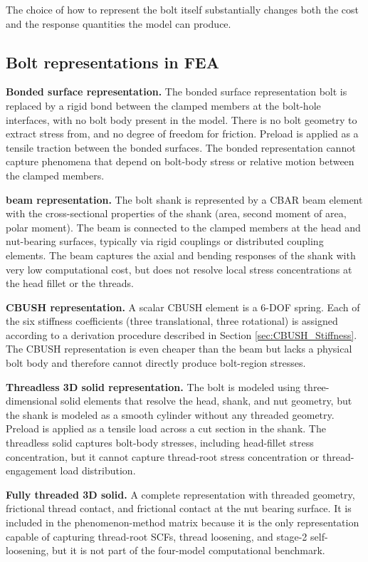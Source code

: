 \documentclass[a4paper,twoside]{bth}
\begin{document}
The choice of how to represent the bolt itself substantially changes both the cost and the response quantities the model can produce.

\subsection{Bolt representations in FEA}
\textbf{Bonded surface representation.} The bonded surface representation bolt is replaced by a rigid bond between the clamped members at the bolt-hole interfaces, with no bolt body present in the model. There is no bolt geometry to extract stress from, and no degree of freedom for friction. Preload is applied as a tensile traction between the bonded surfaces. The bonded representation cannot capture phenomena that depend on bolt-body stress or relative motion between the clamped members.

\textbf{beam representation.} The bolt shank is represented by a CBAR beam element with the cross-sectional properties of the shank (area, second moment of area, polar moment). The beam is connected to the clamped members at the head and nut-bearing surfaces, typically via rigid couplings or distributed coupling elements. The beam captures the axial and bending responses of the shank with very low computational cost, but does not resolve local stress concentrations at the head fillet or the threads.

\textbf{CBUSH representation.} A scalar CBUSH element is a 6-\ac{DOF} spring. Each of the six stiffness coefficients (three translational, three rotational) is assigned according to a derivation procedure described in Section \ref{sec:CBUSH_Stiffness}. The CBUSH representation is even cheaper than the beam but lacks a physical bolt body and therefore cannot directly produce bolt-region stresses.

\textbf{Threadless 3D solid representation.} The bolt is modeled using three-dimensional solid elements that resolve the head, shank, and nut geometry, but the shank is modeled as a smooth cylinder without any threaded geometry. Preload is applied as a tensile load across a cut section in the shank. The threadless solid captures bolt-body stresses, including head-fillet stress concentration, but it cannot capture thread-root stress concentration or thread-engagement load distribution.

\textbf{Fully threaded 3D solid.} A complete representation with threaded geometry, frictional thread contact, and frictional contact at the nut bearing surface. It is included in the phenomenon-method matrix because it is the only representation capable of capturing thread-root SCFs, thread loosening, and stage-2 self-loosening, but it is not part of the four-model computational benchmark.
\end{document}
